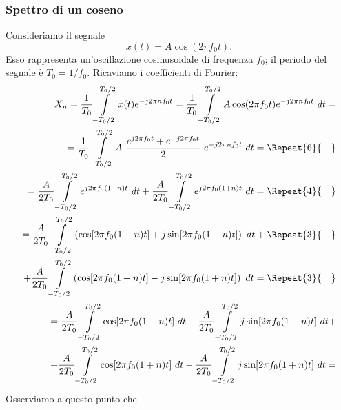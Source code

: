 \documentclass[12pt,oneside,openany]{memoir}
\numberwithin{equation}{subsection}
\newcommand{\quads}[1]{\Repeat{#1}{\quad}}
\newcommand{\dt}{\ dt}
\begin{document}

\subsubsection{Spettro di un coseno}
Consideriamo il segnale
\begin{equation}
	x(t) = A \cos(2 \pi f_0 t).
\end{equation}
Esso rappresenta un'oscillazione cosinusoidale di frequenza $f_0$; il periodo
del segnale \`e $T_0 = 1/f_0$. Ricaviamo i coefficienti di Fourier:
\begin{equation}
	\begin{split}
		X_n = \frac{1}{T_0} \int\displaylimits_{-T_0/2}^{T_0/2} x(t)
		e^{-j 2 \pi n f_0 t} = \frac{1}{T_0}
		\int\displaylimits_{-T_0/2}^{T_0/2} A \cos(2 \pi f_0 t)
		e^{-j 2 \pi n f_0 t} \dt =
		\\
		= \frac{1}{T_0} \int\displaylimits_{-T_0/2}^{T_0/2} A \ 
		\frac{e^{j 2 \pi f_0 t} + e^{-j 2 \pi f_0 t}}{2} \ 
		e^{-j 2 \pi n f_0 t} \dt =
		\quads{6}
		\\
		= \frac{A}{2 T_0} \int\displaylimits_{-T_0/2}^{T_0/2}
		e^{j 2 \pi f_0 (1 - n) t} \dt + \frac{A}{2 T_0} 
		\int\displaylimits_{-T_0/2}^{T_0/2} e^{j 2 \pi f_0 (1 + n) t} 
		\dt =
		\quads{4}
		\\
		= \frac{A}{2 T_0} \int\displaylimits_{-T_0/2}^{T_0/2} \left( 
		\cos[2 \pi f_0 (1 - n) t] + j \sin[2 \pi f_0 (1 - n) t] \right)
		\dt +
		\quads{3}
		\\
		+ \frac{A}{2 T_0} \int\displaylimits_{-T_0/2}^{T_0/2} \left(
		\cos[2 \pi f_0 (1 + n) t] - j \sin[2 \pi f_0 (1 + n) t] \right)
		\dt =
		\quads{3}
		\\
		= \frac{A}{2 T_0} \int\displaylimits_{-T_0/2}^{T_0/2}
		\cos[2 \pi f_0 (1 - n) t] \dt + \frac{A}{2 T_0}
		\int\displaylimits_{-T_0/2}^{T_0/2} j \sin[2 \pi f_0 (1 - n) t]
		\dt +
		\\
		+ \frac{A}{2 T_0} \int\displaylimits_{-T_0/2}^{T_0/2}
		\cos[2 \pi f_0 (1 + n) t] \dt - \frac{A}{2 T_0}
		\int\displaylimits_{-T_0/2}^{T_0/2} j \sin[2 \pi f_0 (1 + n) t]
		\dt =
	\end{split}
\end{equation}
Osserviamo a questo punto che
\end{document}
